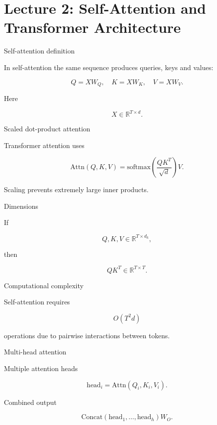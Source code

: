 \documentclass[aspectratio=169]{beamer}
\begin{document}
\section{Lecture 2: Self-Attention and Transformer Architecture}


\begin{frame}{Self-attention definition}

In self-attention the same sequence produces queries, keys and values:

\[
Q = XW_Q, \quad K = XW_K, \quad V = XW_V.
\]

Here

\[
X \in \mathbb{R}^{T\times d}.
\]

\end{frame}


\begin{frame}{Scaled dot-product attention}

Transformer attention uses

\[
\text{Attn}(Q,K,V)
=
\text{softmax}\left(\frac{QK^T}{\sqrt d}\right)V.
\]

Scaling prevents extremely large inner products.

\end{frame}


\begin{frame}{Dimensions}

If

\[
Q,K,V \in \mathbb{R}^{T\times d_k},
\]

then

\[
QK^T \in \mathbb{R}^{T\times T}.
\]

\end{frame}


\begin{frame}{Computational complexity}

Self-attention requires

\[
O(T^2 d)
\]

operations due to pairwise interactions between tokens.

\end{frame}


\begin{frame}{Multi-head attention}

Multiple attention heads

\[
\text{head}_i = \text{Attn}(Q_i,K_i,V_i).
\]

Combined output

\[
\text{Concat}(\text{head}_1,\dots,\text{head}_h)W_O.
\]

\end{frame}
\end{document}
